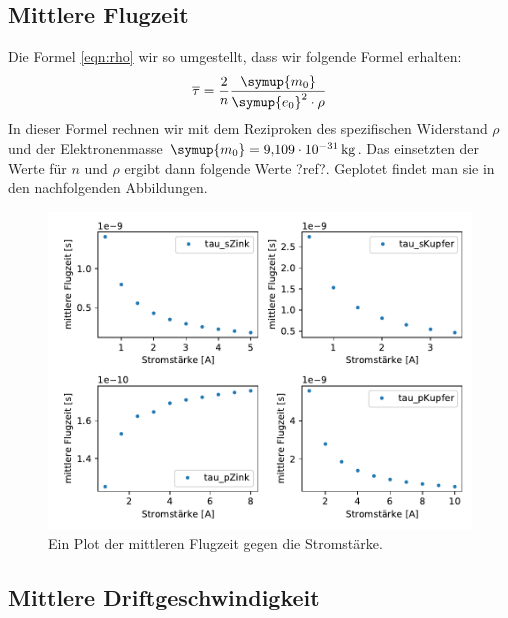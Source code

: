     \subsection{Mittlere Flugzeit}

    
    Die Formel \ref{eqn:rho} wir so umgestellt, dass wir folgende Formel erhalten:
    \begin{equation}
        \overline{\tau} =\frac{2}{n}\frac{\symup{m_0}}{\symup{e_0}^2 \cdot \rho}
    \end{equation}
    In dieser Formel rechnen wir mit dem Reziproken des spezifischen Widerstand $\rho$ und der Elektronenmasse
    $\symup{m_0} = \SI{9.109e-31}{\kilogram}$. Das einsetzten der Werte für $n$ und $\rho$ ergibt dann folgende Werte ?ref?.
    Geplotet findet man sie in den nachfolgenden Abbildungen.

    \begin{figure}[H]
        \centering
        \includegraphics[width=1.1\textwidth]{build/tau.pdf}
        \caption{Ein Plot der mittleren Flugzeit gegen die Stromstärke.}
        \label{img:tau}
    \end{figure}


    \subsection{Mittlere Driftgeschwindigkeit}


